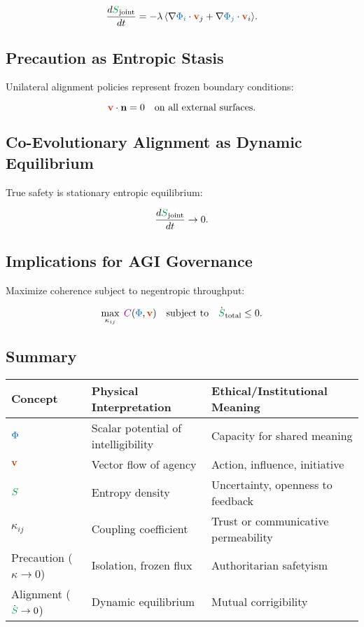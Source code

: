 \documentclass[11pt,a4paper]{article}
\newcommand{\scalar}[1]{\textcolor{scalarcolor}{\ensuremath{#1}}}
\newcommand{\vect}[1]{\textcolor{vectorcolor}{\ensuremath{\mathbf{#1}}}}
\newcommand{\entropy}[1]{\textcolor{entropycolor}{\ensuremath{#1}}}
\newcommand{\coherence}[1]{\textcolor{coherencecolor}{\ensuremath{#1}}}
\theoremstyle{definition}
\theoremstyle{plain}
\begin{document}
\begin{mdframed}[style=appendixbox]
\begin{equation}
\frac{d\entropy{S}_{\text{joint}}}{dt} = -\lambda \, \langle \nabla \scalar{\Phi_i} \cdot \vect{v}_j + \nabla \scalar{\Phi_j} \cdot \vect{v}_i \rangle.
\end{equation}

\subsection{Precaution as Entropic Stasis}
Unilateral alignment policies represent frozen boundary conditions:

\begin{equation}
\vect{v} \cdot \mathbf{n} = 0 \quad \text{on all external surfaces.}
\end{equation}

\subsection{Co-Evolutionary Alignment as Dynamic Equilibrium}
True safety is stationary entropic equilibrium:

\begin{equation}
\frac{d\entropy{S}_{\text{joint}}}{dt} \to 0.
\end{equation}

\subsection{Implications for AGI Governance}
Maximize coherence subject to negentropic throughput:

\begin{equation}
\max_{\kappa_{ij}} \; \coherence{C}(\scalar{\Phi}, \vect{v}) \quad \text{subject to} \quad \dot{\entropy{S}}_{\text{total}} \le 0.
\end{equation}

\subsection{Summary}
\begin{table}[h]
\centering
\begin{tabular}{lll}
\toprule
\textbf{Concept} & \textbf{Physical Interpretation} & \textbf{Ethical/Institutional Meaning} \\
\midrule
\(\scalar{\Phi}\) & Scalar potential of intelligibility & Capacity for shared meaning \\
\(\vect{v}\) & Vector flow of agency & Action, influence, initiative \\
\(\entropy{S}\) & Entropy density & Uncertainty, openness to feedback \\
\(\kappa_{ij}\) & Coupling coefficient & Trust or communicative permeability \\
Precaution (\(\kappa \to 0\)) & Isolation, frozen flux & Authoritarian safetyism \\
Alignment (\(\dot{\entropy{S}} \to 0\)) & Dynamic equilibrium & Mutual corrigibility \\
\bottomrule
\end{tabular}
\end{table}


\end{mdframed}
\end{document}
